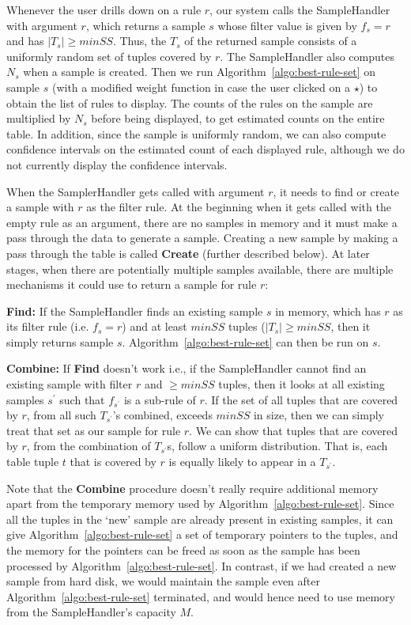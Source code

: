 Whenever the user drills down on a rule $r$, our system calls the SampleHandler with argument $r$, which returns a sample $s$ whose filter value is given by $f_s = r$ and has $|T_s| \geq minSS$. Thus, the $T_s$ of the returned sample consists of a uniformly random set of tuples covered by $r$. The SampleHandler also computes $N_s$ when a sample is created. Then we run Algorithm~\ref{algo:best-rule-set} on sample $s$ (with a modified weight function in case the user clicked on a $\star$) to obtain the list of rules to display. The counts of the rules on the sample are multiplied by $N_s$ before being displayed, to get estimated counts on the entire table. In addition, since the sample is uniformly random, we can also compute confidence intervals on the estimated count of each displayed rule, although we do not currently display the confidence intervals.

When the SamplerHandler gets called with argument $r$, it needs to find or create a sample with $r$ as the filter rule. At the beginning when it gets called with the empty rule as an argument, there are no samples in memory and it must make a pass through the data to generate a sample. Creating a new sample by making a pass through the table is called \textbf{Create} (further described below). At later stages, when there are potentially multiple samples available, there are multiple mechanisms it could use to return a sample for rule $r$:
\squishlist
\item \textbf{Find:} If the SampleHandler finds an existing sample $s$ in memory, which has $r$ as its filter rule (i.e. $f_s = r$) and at least $minSS$ tuples ($|T_s| \geq minSS$, then it simply returns sample $s$. Algorithm~\ref{algo:best-rule-set} can then be run on $s$. 

\item \textbf{Combine:} If \textbf{Find} doesn't work i.e., if the SampleHandler cannot find an existing sample with filter $r$ and $\geq minSS$ tuples, then it looks at all existing samples $s^{\prime}$ such that $f_{s^{\prime}}$ is a sub-rule of $r$. If the set of all tuples that are covered by $r$, from all such $T_{s^{\prime}}$'s combined, exceeds $minSS$ in size, then we can simply treat that set as our sample for rule $r$.
We can show that tuples that are covered by $r$, from the combination of $T_{s^{\prime}}$s, follow a uniform distribution. That is, each table tuple $t$ that is covered by $r$ is equally likely to appear in a $T_{s^{\prime}}$. 

Note that the \textbf{Combine} procedure doesn't really require additional memory apart from the temporary memory used by Algorithm~\ref{algo:best-rule-set}. Since all the tuples in the `new' sample are already present in existing samples, it can give Algorithm~\ref{algo:best-rule-set} a set of temporary pointers to the tuples, and the memory for the pointers can be freed as soon as the sample has been processed by Algorithm~\ref{algo:best-rule-set}. In contrast, if we had created a new sample from hard disk, we would maintain the sample even after Algorithm~\ref{algo:best-rule-set} terminated, and would hence need to use memory from the SampleHandler's capacity $M$.

